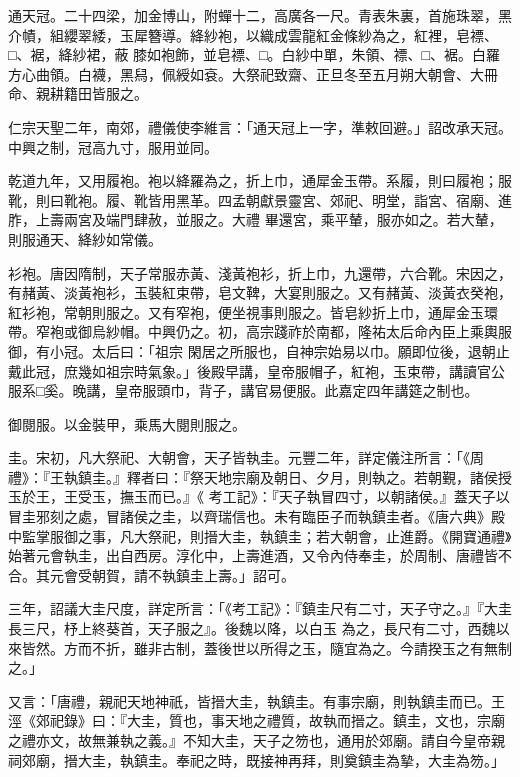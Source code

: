 \begin{pinyinscope}
 通天冠。二十四梁，加金博山，附蟬十二，高廣各一尺。青表朱裏，首施珠翠，黑介幘，組纓翠緌，玉犀簪導。絳紗袍，以織成雲龍紅金條紗為之，紅裡，皂褾、□、裾，絳紗裙，蔽
 膝如袍飾，並皂褾、□。白紗中單，朱領、褾、□、裾。白羅方心曲領。白襪，黑舄，佩綬如袞。大祭祀致齋、正旦冬至五月朔大朝會、大冊命、親耕籍田皆服之。



 仁宗天聖二年，南郊，禮儀使李維言：「通天冠上一字，準敕回避。」詔改承天冠。中興之制，冠高九寸，服用並同。



 乾道九年，又用履袍。袍以絳羅為之，折上巾，通犀金玉帶。系履，則曰履袍；服靴，則曰靴袍。履、靴皆用黑革。四孟朝獻景靈宮、郊祀、明堂，詣宮、宿廟、進胙，上壽兩宮及端門肆赦，並服之。大禮
 畢還宮，乘平輦，服亦如之。若大輦，則服通天、絳紗如常儀。



 衫袍。唐因隋制，天子常服赤黃、淺黃袍衫，折上巾，九還帶，六合靴。宋因之，有赭黃、淡黃袍衫，玉裝紅束帶，皂文鞞，大宴則服之。又有赭黃、淡黃衣癸袍，紅衫袍，常朝則服之。又有窄袍，便坐視事則服之。皆皂紗折上巾，通犀金玉環帶。窄袍或御烏紗帽。中興仍之。初，高宗踐祚於南都，隆祐太后命內臣上乘輿服御，有小冠。太后曰：「祖宗
 閑居之所服也，自神宗始易以巾。願即位後，退朝止戴此冠，庶幾如祖宗時氣象。」後殿早講，皇帝服帽子，紅袍，玉束帶，講讀官公服系□奚。晚講，皇帝服頭巾，背子，講官易便服。此嘉定四年講筵之制也。



 御閱服。以金裝甲，乘馬大閱則服之。



 圭。宋初，凡大祭祀、大朝會，天子皆執圭。元豐二年，詳定儀注所言：「《周禮》：『王執鎮圭。』釋者曰：『祭天地宗廟及朝日、夕月，則執之。若朝覲，諸侯授玉於王，王受玉，撫玉而已。』《
 考工記》：『天子執冒四寸，以朝諸侯。』蓋天子以冒圭邪刻之處，冒諸侯之圭，以齊瑞信也。未有臨臣子而執鎮圭者。《唐六典》殿中監掌服御之事，凡大祭祀，則搢大圭，執鎮圭；若大朝會，止進爵。《開寶通禮》始著元會執圭，出自西房。淳化中，上壽進酒，又令內侍奉圭，於周制、唐禮皆不合。其元會受朝賀，請不執鎮圭上壽。」詔可。



 三年，詔議大圭尺度，詳定所言：「《考工記》：『鎮圭尺有二寸，天子守之。』『大圭長三尺，杼上終葵首，天子服之』。後魏以降，以白玉
 為之，長尺有二寸，西魏以來皆然。方而不折，雖非古制，蓋後世以所得之玉，隨宜為之。今請揆玉之有無制之。」



 又言：「唐禮，親祀天地神祇，皆搢大圭，執鎮圭。有事宗廟，則執鎮圭而已。王涇《郊祀錄》曰：『大圭，質也，事天地之禮質，故執而搢之。鎮圭，文也，宗廟之禮亦文，故無兼執之義。』不知大圭，天子之笏也，通用於郊廟。請自今皇帝親祠郊廟，搢大圭，執鎮圭。奉祀之時，既接神再拜，則奠鎮圭為摯，大圭為笏。」




\end{pinyinscope}
